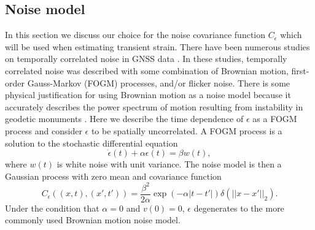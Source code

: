 \documentclass[10pt,a4paper]{article}
\begin{document}
\subsection{Noise model}\label{sec:NoiseModel}
In this section we discuss our choice for the noise covariance function $C_\epsilon$ which will be used when estimating transient strain.  There have been numerous studies on temporally correlated noise in GNSS data \citep[e.g.,][]{Zhang1997,Mao1999,Williams2004,Langbein2008}. In these studies, temporally correlated noise was described with some combination of Brownian motion, first-order Gauss-Markov (FOGM) processes, and/or flicker noise. There is some physical justification for using Brownian motion as a noise model because it accurately describes the power spectrum of motion resulting from instability in geodetic monuments \citep[e.g.,][]{Wyatt1982,Wyatt1989,Langbein1997}. Here we describe the time dependence of $\epsilon$ as a FOGM process and consider $\epsilon$ to be spatially uncorrelated. A FOGM process is a solution to the stochastic differential equation
\begin{equation}
\dot{\epsilon}(t) + \alpha \epsilon(t) = \beta w(t),
\end{equation}
where $w(t)$ is white noise with unit variance. The noise model is then a Gaussian process with zero mean and covariance function
\begin{equation}\label{eq:FOGM}
C_\epsilon\left((x,t),(x',t')\right) = \frac{\beta^2}{2\alpha}\exp\left(-\alpha|t - t'|\right) \delta(||x - x'||_2). 
\end{equation}
Under the condition that $\alpha = 0$ and $v(0) = 0$, $\epsilon$ degenerates to the more commonly used Brownian motion noise model. 
\end{document}
